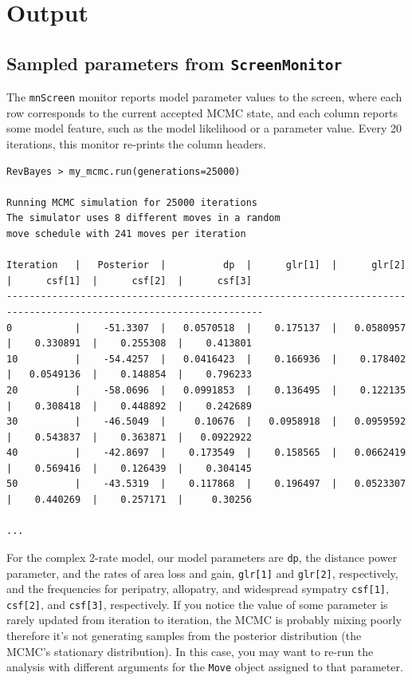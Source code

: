 \documentclass[11pt]{article}
\begin{document}
\section{Output}

\subsection{Sampled parameters from {\tt ScreenMonitor}}

The {\tt mnScreen} monitor reports model parameter values to the screen, where each row corresponds to the current accepted MCMC state, and each column reports some model feature, such as the model likelihood or a parameter value.
Every 20 iterations, this monitor re-prints the column headers.

\begin{snugshade}
\begin{lstlisting}[basicstyle=\tiny \listingsfont, columns=texcl]
RevBayes > my_mcmc.run(generations=25000)

Running MCMC simulation for 25000 iterations
The simulator uses 8 different moves in a random
move schedule with 241 moves per iteration

Iteration   |   Posterior  |          dp  |      glr[1]  |      glr[2]  |      csf[1]  |      csf[2]  |      csf[3]
-------------------------------------------------------------------------------------------------------------------
0           |    -51.3307  |   0.0570518  |    0.175137  |   0.0580957  |    0.330891  |    0.255308  |    0.413801
10          |    -54.4257  |   0.0416423  |    0.166936  |    0.178402  |   0.0549136  |    0.148854  |    0.796233
20          |    -58.0696  |   0.0991853  |    0.136495  |    0.122135  |    0.308418  |    0.448892  |    0.242689
30          |    -46.5049  |     0.10676  |   0.0958918  |   0.0959592  |    0.543837  |    0.363871  |   0.0922922
40          |    -42.8697  |    0.173549  |    0.158565  |   0.0662419  |    0.569416  |    0.126439  |    0.304145
50          |    -43.5319  |    0.117868  |    0.196497  |   0.0523307  |    0.440269  |    0.257171  |     0.30256

...
\end{lstlisting}
\end{snugshade}

For the complex 2-rate model, our model parameters are {\tt dp}, the distance power parameter, and the rates of area loss and gain, {\tt glr[1]} and {\tt glr[2]}, respectively, and the frequencies for peripatry, allopatry, and widespread sympatry {\tt csf[1]}, {\tt csf[2]}, and {\tt csf[3]}, respectively. 
If you notice the value of some parameter is rarely updated from iteration to iteration, the MCMC is probably mixing poorly therefore it's not generating samples from the posterior distribution (the MCMC's stationary distribution).
In this case, you may want to re-run the analysis with different arguments for the {\tt Move} object assigned to that parameter.
\end{document}
